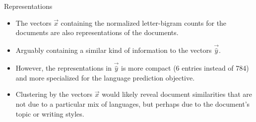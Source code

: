 \documentclass[handout]{beamer}
\begin{document}
\begin{frame}{Representations}

\begin{scriptsize}
\begin{itemize}
\item The vectors $\vec{x}$ containing the normalized letter-bigram counts for the documents are also representations of the documents.
\item Arguably containing a similar kind of information to the vectors $\vec{\hat{y}}$. 
\item However, the representations in  $\vec{\hat{y}}$ is more compact (6 entries instead of 784) and more specialized for the language prediction objective.
\item Clustering by the vectors $\vec{x}$ would likely reveal document similarities that are not due to a particular mix of languages, but perhaps due to the document's topic or writing styles.
\end{itemize}
\end{scriptsize}
\end{frame}
\end{document}
